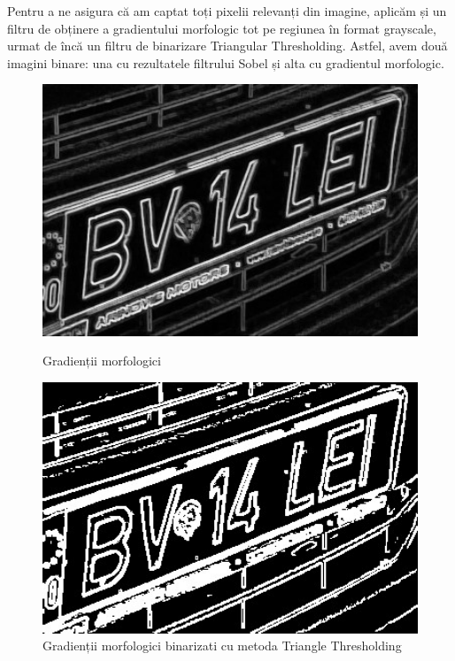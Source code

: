 \documentclass[a4paper,12pt]{report}
\begin{document}
Pentru a ne asigura că am captat toți pixelii relevanți din imagine, aplicăm și un filtru de obținere a gradientului morfologic tot pe regiunea în format grayscale, urmat de încă un filtru de binarizare Triangular Thresholding. Astfel, avem două imagini binare: una cu rezultatele filtrului Sobel și alta cu gradientul morfologic.

\begin{figure}[h!]
    \centering
    \begin{minipage}{0.4\textwidth}
        \centering
        \includegraphics[width=1\textwidth]{images/gradient.jpg}
        \caption{Gradienții morfologici}
    \end{minipage}
    \hspace{0.05\textwidth}
    \begin{minipage}{0.4\textwidth}
        \centering
        \includegraphics[width=1\textwidth]{images/binary_gradient.jpg}
        \caption{Gradienții morfologici binarizati cu metoda Triangle Thresholding}
    \end{minipage}
\end{figure}
\FloatBarrier
\end{document}
